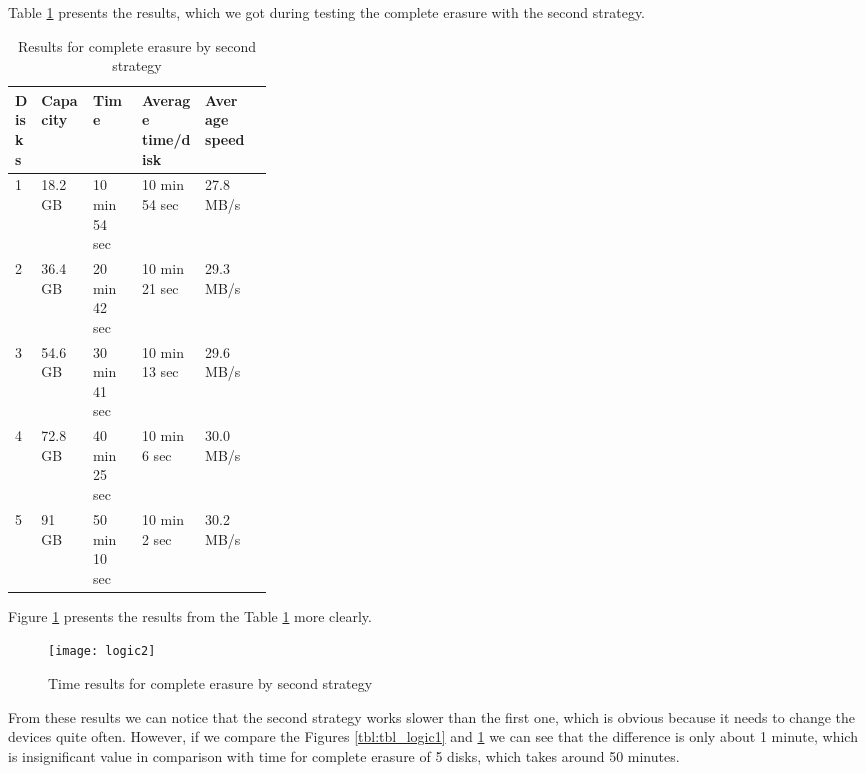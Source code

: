 \newpage
Table \ref{tbl:tbl_logic2} presents the results, which we got during testing the complete erasure with the second strategy.

\begin{table}[h!]
  \caption{Results for complete erasure by second strategy}
  \begin{center}
  \begin{tabularx}{\textwidth}{|p{0.1\linewidth}|p{0.2\linewidth}|X|X|X|X|}
    \hline
    Disks & Capacity & Time & Average time/disk & Average speed
    \\ \hline
    1 & 18.2 GB & 10 min 54 sec & 10 min 54 sec & 27.8 MB/s \\ \hline    
    2 & 36.4 GB & 20 min 42 sec & 10 min 21 sec & 29.3 MB/s \\ \hline
    3 & 54.6 GB & 30 min 41 sec & 10 min 13 sec & 29.6 MB/s \\ \hline
    4 & 72.8 GB & 40 min 25 sec & 10 min 6 sec  & 30.0 MB/s \\ \hline
    5 & 91 GB   & 50 min 10 sec & 10 min 2 sec  & 30.2 MB/s \\ \hline
  \end{tabularx}
  \label{tbl:tbl_logic2}
  \end{center}
\end{table}
Figure \ref{fig:logic2} presents the results from the Table \ref{tbl:tbl_logic2} more clearly.
\begin{figure}[h!]
\begin{center}
  \texttt{[image: logic2]}
\end{center}
  \caption{Time results for complete erasure by second strategy}
  \label{fig:logic2}
\end{figure}

From these results we can notice that the second strategy works slower than the first one, which is obvious because it needs to change the devices quite often. However, if we compare the Figures \ref{tbl:tbl_logic1} and \ref{fig:logic2} we can see that the difference is only about 1 minute, which is insignificant value in comparison with time for complete erasure of 5 disks, which takes around 50 minutes. 

